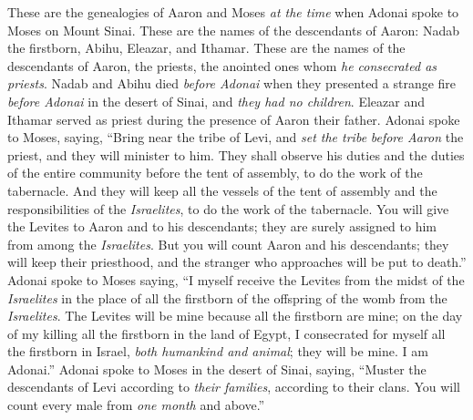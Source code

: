 \begin{biblechapter} %
 These are the genealogies of Aaron and Moses \textit{at the time} when Adonai spoke to Moses on Mount Sinai.
\verse These are the names of the descendants of Aaron: Nadab the firstborn, Abihu, Eleazar, and Ithamar.
\verse These are the names of the descendants of Aaron, the priests, the anointed ones whom \textit{he consecrated as priests}.
\verse Nadab and Abihu died \textit{before Adonai} when they presented a strange fire \textit{before Adonai} in the desert of Sinai, and \textit{they had no children}. Eleazar and Ithamar served as priest during the presence of Aaron their father.
\verse Adonai spoke to Moses, saying,
\verse “Bring near the tribe of Levi, and \textit{set the tribe} \textit{before Aaron} the priest, and they will minister to him.
\verse They shall observe his duties and the duties of the entire community before the tent of assembly, to do the work of the tabernacle.
\verse And they will keep all the vessels of the tent of assembly and the responsibilities of the \textit{Israelites}, to do the work of the tabernacle.
\verse You will give the Levites to Aaron and to his descendants; they are surely assigned to him from among the \textit{Israelites}.
\verse But you will count Aaron and his descendants; they will keep their priesthood, and the stranger who approaches will be put to death.”
\verse Adonai spoke to Moses saying,
\verse “I myself receive the Levites from the midst of the \textit{Israelites} in the place of all the firstborn of the offspring of the womb from the \textit{Israelites}. The Levites will be mine
\verse because all the firstborn are mine; on the day of my killing all the firstborn in the land of Egypt, I consecrated for myself all the firstborn in Israel, \textit{both humankind and animal}; they will be mine. I am Adonai.”
\verse Adonai spoke to Moses in the desert of Sinai, saying,
\verse “Muster the descendants of Levi according to \textit{their families}, according to their clans. You will count every male from \textit{one month} and above.”

\end{biblechapter}
